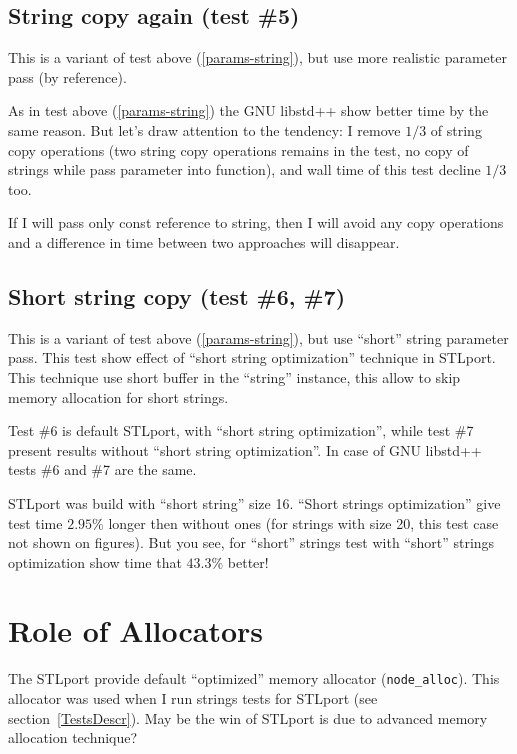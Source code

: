 \documentclass[a4paper]{article}
\providecommand{\STLport}{{\fontfamily{cmss}\selectfont STLport}}
\providecommand{\libstd}{{\fontfamily{cmtt}\selectfont GNU \mbox{libstd++}}}
\begin{document}
\subsection{String copy again\label{params-ref-string} (test \#5)}

This is a variant of test above (\ref{params-string}), but use more realistic
parameter pass (by reference).



As in test above (\ref{params-string}) the \libstd{} show better time
by the same reason. But let's draw attention to the tendency: I remove
$1/3$ of string copy operations (two string copy operations remains in the test, no copy of strings while pass
parameter into function), and wall time of this test decline $1/3$ too.

If I will pass only const reference to string, then I will avoid any copy
operations and a difference in time between two approaches will disappear.

\subsection{Short string copy\label{params-short-string} (test \#6, \#7)}

This is a variant of test above (\ref{params-string}), but use ``short'' string
parameter pass. This test show effect of ``short string optimization'' technique
in \STLport{}. This technique use short buffer in the ``string'' instance,
this allow to skip memory allocation for short strings.



Test \#6 is default \STLport{}, with ``short string optimization'', while
test \#7 present results without ``short string optimization''. In case of \libstd{}
tests \#6 and \#7 are the same.

\STLport{} was build with ``short string'' size 16. ``Short strings optimization'' give
test time $2.95\%$ longer then without ones (for strings with size 20, this test case
not shown on figures).
But you see, for ``short'' strings test with ``short'' strings optimization
show time that $43.3\%$ better!

\section{Role of Allocators}

The \STLport{} provide default ``optimized'' memory allocator
(\verb|node_alloc|). This allocator was used when I run strings tests
for \STLport{} (see section~\ref{TestsDescr}). May be the win of \STLport{} is
due to advanced memory allocation technique?
\end{document}
